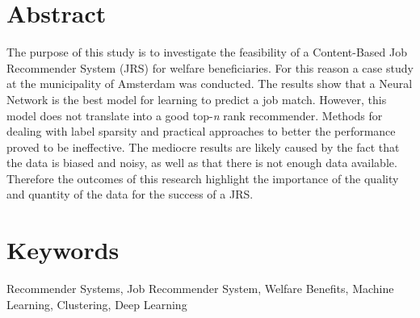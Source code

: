 \documentclass[10pt, sigconf, format=acmsmall, screen=true, review=false]{acmart}
\begin{document}
%

\pagebreak




\footnotesize

{}


\section*{Abstract}
The purpose of this study is to investigate the feasibility of a Content-Based Job Recommender System (JRS) for welfare beneficiaries.
For this reason a case study at the municipality of Amsterdam was conducted.
The results show that a Neural Network is the best model for learning to predict a job match. 
However, this model does not translate into a good top-\textit{n} rank recommender. 
Methods for dealing with label sparsity and practical approaches to better the performance proved to be ineffective. 
The mediocre results are likely caused by the fact that the data is biased and noisy, as well as that there is not enough data available.
Therefore the outcomes of this research highlight the importance of the quality and quantity of the data for the success of a JRS.

\section*{Keywords}
Recommender Systems, Job Recommender System, Welfare Benefits, Machine Learning, Clustering, Deep Learning









\end{document}
